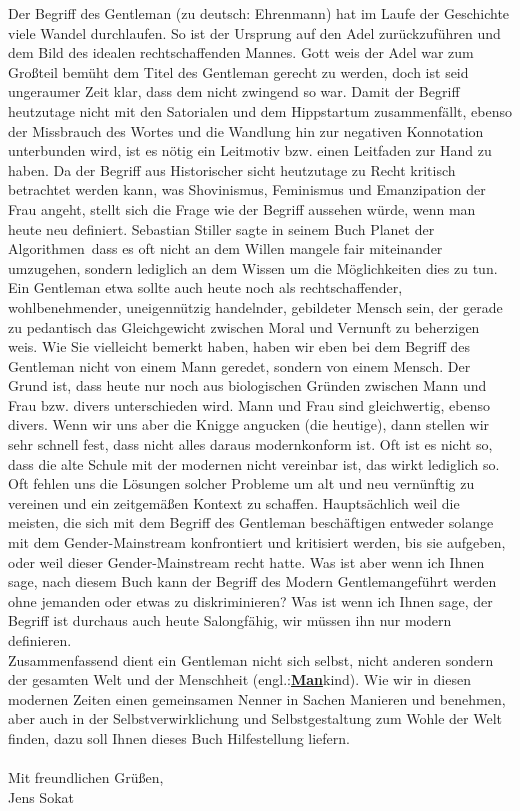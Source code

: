 Der Begriff des Gentleman (zu deutsch: Ehrenmann) hat im Laufe der Geschichte viele Wandel durchlaufen. 
So ist der Ursprung auf den Adel zurückzuführen und dem Bild des idealen rechtschaffenden Mannes. 
Gott weis der Adel war zum Großteil bemüht dem Titel des Gentleman gerecht zu werden, doch ist seid ungeraumer Zeit klar, 
dass dem nicht zwingend so war. Damit der Begriff heutzutage nicht mit den Satorialen und dem Hippstartum zusammenfällt,
ebenso der Missbrauch des Wortes und die Wandlung hin zur negativen Konnotation unterbunden wird, ist es nötig ein Leitmotiv bzw. 
einen Leitfaden zur Hand zu haben. Da der Begriff aus Historischer sicht heutzutage zu Recht kritisch betrachtet werden kann, was Shovinismus,
Feminismus und Emanzipation der Frau angeht, stellt sich die Frage wie der Begriff aussehen würde, wenn man heute neu definiert.
Sebastian Stiller sagte in seinem Buch \glqq Planet der Algorithmen\grqq \, dass es oft nicht an dem Willen mangele
fair miteinander umzugehen, sondern lediglich an dem Wissen um die Möglichkeiten dies zu tun.
Ein Gentleman etwa sollte auch heute noch als rechtschaffender, wohlbenehmender, uneigennützig handelnder, 
gebildeter Mensch sein, der gerade zu pedantisch das Gleichgewicht zwischen Moral und Vernunft zu beherzigen weis.
Wie Sie vielleicht bemerkt haben, haben wir eben bei dem Begriff des Gentleman nicht von einem Mann geredet,
sondern von einem Mensch. Der Grund ist, dass heute nur noch aus biologischen Gründen zwischen Mann und Frau bzw. divers
unterschieden wird. Mann und Frau sind gleichwertig, ebenso divers. Wenn wir uns aber die Knigge angucken (die heutige),
dann stellen wir sehr schnell fest, dass nicht alles daraus modernkonform ist. Oft ist es nicht so, dass die alte Schule mit
der modernen nicht vereinbar ist, das wirkt lediglich so. Oft fehlen uns die Lösungen solcher Probleme um alt und neu vernünftig
zu vereinen und ein zeitgemäßen Kontext zu schaffen. Hauptsächlich weil die meisten, die sich mit dem Begriff des Gentleman beschäftigen
entweder solange mit dem Gender-Mainstream konfrontiert und kritisiert werden, bis sie aufgeben, oder weil dieser Gender-Mainstream
recht hatte. Was ist aber wenn ich Ihnen sage, nach diesem Buch kann der Begriff des \glqq Modern Gentleman\grqq geführt werden ohne jemanden
oder etwas zu diskriminieren? Was ist wenn ich Ihnen sage, der Begriff ist durchaus auch heute Salongfähig, wir müssen ihn nur modern definieren.
\\
Zusammenfassend dient ein Gentleman nicht sich selbst, nicht anderen sondern der gesamten Welt und der Menschheit (engl.:\underline{\textbf{Man}}kind).
Wie wir in diesen modernen Zeiten einen gemeinsamen Nenner in Sachen Manieren und benehmen, aber auch in der Selbstverwirklichung
und Selbstgestaltung zum Wohle der Welt finden, dazu soll Ihnen dieses Buch Hilfestellung liefern.
\\
\\
Mit freundlichen Grüßen,\\

Jens Sokat


